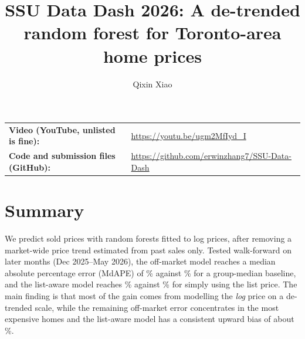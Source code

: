 \documentclass[11pt]{article}
\title{SSU Data Dash 2026: A de-trended random forest for Toronto-area home prices}
\author{Qixin Xiao}
\date{}
\begin{document}
\maketitle

\noindent\begin{tabular}{@{}ll}
\textbf{Video (YouTube, unlisted is fine):} & \url{https://youtu.be/ugm2MfIyd_I} \\
\textbf{Code and submission files (GitHub):} & \url{https://github.com/erwinzhang7/SSU-Data-Dash} \\
\end{tabular}

\section*{Summary}
We predict sold prices with random forests fitted to log prices, after removing a market-wide price trend estimated from past sales only. Tested walk-forward on later months (Dec 2025--May 2026), the off-market model reaches a median absolute percentage error (MdAPE) of \offMdAPE\% against \offBaseMdAPE\% for a group-median baseline, and the list-aware model reaches \laMdAPE\% against \laBaseMdAPE\% for simply using the list price. The main finding is that most of the gain comes from modelling the \emph{log} price on a de-trended scale, while the remaining off-market error concentrates in the most expensive homes and the list-aware model has a consistent upward bias of about \laBiasPct\%.
\end{document}
